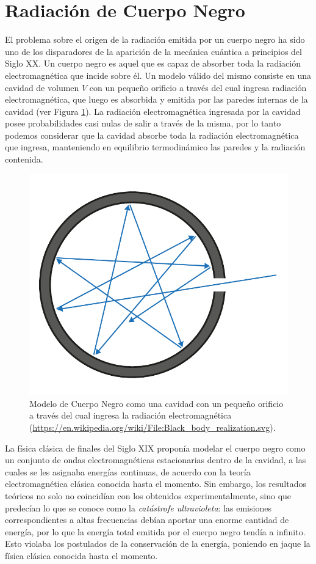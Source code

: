 \documentclass[a4paper,11pt]{article}
\begin{document}
\section{Radiación de Cuerpo Negro}

El problema sobre el origen de la radiación emitida por un cuerpo negro ha 
sido uno de los disparadores de la aparición de la mecánica cuántica a 
principios del Siglo XX.
Un cuerpo negro es aquel que es capaz de absorber toda la radiación 
electromagnética que incide sobre él.
Un modelo válido del mismo consiste en una cavidad de volumen $V$ con un 
pequeño orificio a través del cual ingresa radiación electromagnética, que 
luego es absorbida y emitida por las paredes internas de la cavidad (ver 
Figura \ref{fig:cuerpo-negro}).
La radiación electromagnética ingresada por la cavidad posee 
probabilidades casi nulas de salir a través de la misma, por lo tanto podemos 
considerar que la cavidad absorbe toda la radiación electromagnética que 
ingresa, manteniendo en equilibrio termodinámico las paredes y la radiación 
contenida.

\begin{figure}[b!]
\centering
\includegraphics[width=0.5\linewidth]{figs/cuerpo-negro.pdf}
\caption{Modelo de Cuerpo Negro como una cavidad con un pequeño orificio a 
         través del cual ingresa la radiación electromagnética
         (\url{https://en.wikipedia.org/wiki/File:Black_body_realization.svg}).
         }
\label{fig:cuerpo-negro}
\end{figure}

La física clásica de finales del Siglo XIX proponía modelar el cuerpo negro 
como un conjunto de ondas electromagnéticas estacionarias dentro de la 
cavidad, a las cuales se les asignaba energías continuas, de acuerdo con la 
teoría electromagnética clásica conocida hasta el momento.
Sin embargo, los resultados teóricos no solo no coincidían con los 
obtenidos experimentalmente, sino que predecían lo que se conoce como la 
\emph{catástrofe ultravioleta}: las emisiones correspondientes a altas 
frecuencias debían aportar una enorme cantidad de energía, por lo que la 
energía total emitida por el cuerpo negro tendía a infinito.
Esto violaba los postulados de la conservación de la energía, poniendo en 
jaque la física clásica conocida hasta el momento.
\end{document}
